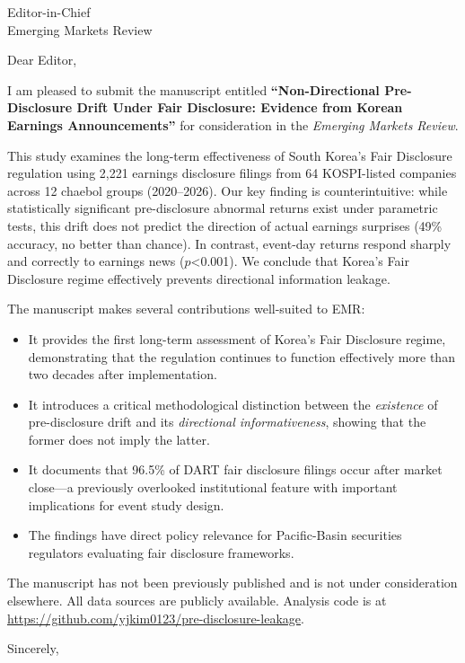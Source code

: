\documentclass[11pt]{letter}
\begin{document}
\begin{letter}{Editor-in-Chief\\Emerging Markets Review}

\opening{Dear Editor,}

I am pleased to submit the manuscript entitled \textbf{``Non-Directional Pre-Disclosure Drift Under Fair Disclosure: Evidence from Korean Earnings Announcements''} for consideration in the \textit{Emerging Markets Review}.

This study examines the long-term effectiveness of South Korea's Fair Disclosure regulation using 2,221 earnings disclosure filings from 64 KOSPI-listed companies across 12 chaebol groups (2020--2026). Our key finding is counterintuitive: while statistically significant pre-disclosure abnormal returns exist under parametric tests, this drift does not predict the direction of actual earnings surprises (49\% accuracy, no better than chance). In contrast, event-day returns respond sharply and correctly to earnings news ($p$<0.001). We conclude that Korea's Fair Disclosure regime effectively prevents directional information leakage.

The manuscript makes several contributions well-suited to EMR:
\begin{itemize}
    \item It provides the first long-term assessment of Korea's Fair Disclosure regime, demonstrating that the regulation continues to function effectively more than two decades after implementation.
    \item It introduces a critical methodological distinction between the \textit{existence} of pre-disclosure drift and its \textit{directional informativeness}, showing that the former does not imply the latter.
    \item It documents that 96.5\% of DART fair disclosure filings occur after market close---a previously overlooked institutional feature with important implications for event study design.
    \item The findings have direct policy relevance for Pacific-Basin securities regulators evaluating fair disclosure frameworks.
\end{itemize}

The manuscript has not been previously published and is not under consideration elsewhere. All data sources are publicly available. Analysis code is at \url{https://github.com/yjkim0123/pre-disclosure-leakage}.

\closing{Sincerely,}

\end{letter}
\end{document}
